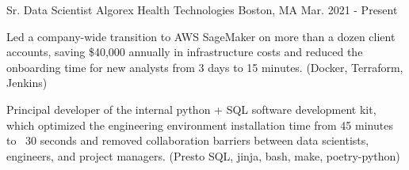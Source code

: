 

\begin{cventries}

  \cventry
    {Sr. Data Scientist} %
    {Algorex Health Technologies} %
    {Boston, MA} %
    {Mar. 2021 - Present} %
    {
      \begin{cvitems} %
      \item {
        Led a company-wide transition to AWS SageMaker on more than a dozen
        client accounts, saving \$40,000 annually in infrastructure costs and
        reduced the onboarding time for new analysts from 3 days to 15 minutes.
        (Docker, Terraform, Jenkins)
      }
      \item {
        Principal developer of the internal python + SQL software development
        kit, which optimized the engineering environment installation time from
        45 minutes to ~30 seconds and removed collaboration barriers between
        data scientists, engineers, and project managers. (Presto SQL, jinja, bash,
        make, poetry-python)
      }
      \end{cvitems}
    }


\end{cventries}
